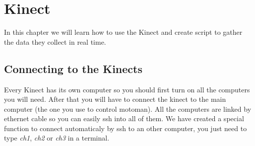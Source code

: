 \chapter{Kinect}

In this chapter we will learn how to use the Kinect and create script to gather the data they collect in real time.

\section{Connecting to the Kinects}

Every Kinect has its own computer so you should first turn on all the computers you will need. After that you will have to connect the kinect to the main computer (the one you use to control motoman). All the computers are linked by ethernet cable so you can easily ssh into all of them. We have created a special function to connect automaticaly by ssh to an other computer, you just need to type \emph{ch1}, \emph{ch2} or \emph{ch3} in a terminal.